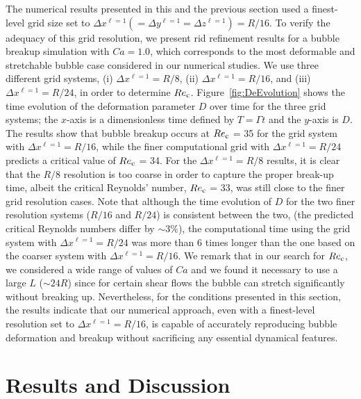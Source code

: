 \documentclass[review]{elsarticle}
\begin{document}
The numerical results presented in this and the previous section used a
finest-level grid size set to $\Delta x^{\ell=1}(= \Delta y^{\ell=1}= \Delta
z^{\ell=1})=R/16$. To verify the adequacy of this grid resolution, we present
rid refinement results for a bubble breakup simulation with $Ca=1.0$, which
corresponds to the most deformable and stretchable bubble case considered in
our numerical studies. We use three different grid systems, (i) $\Delta
x^{\ell=1}=R/8$, (ii) $\Delta x^{\ell=1}=R/16$, and (iii) $\Delta
x^{\ell=1}=R/24$, in order to determine $Re_{\rm c}$.
Figure~\ref{fig:DeEvolution} shows the time evolution of the deformation
parameter $D$ over time for the three grid systems; the $x$-axis is a
dimensionless time defined by $T=\mathit{\Gamma} t$ and the $y$-axis is $D$.
The results show that bubble breakup occurs at $Re_{\rm c}$ = 35 for the grid
system with $\Delta x^{\ell=1}=R/16$, while the finer computational grid with
$\Delta x^{\ell=1}=R/24$ predicts a critical value of $Re_{\rm c}$ = 34.  For
the $\Delta x^{\ell=1}=R/8$ results, it is clear that the $R/8$ resolution is
too coarse in order to capture the proper break-up time, albeit the critical
Reynolds' number, $Re_{\rm c}$ = 33, was still close to the finer grid
resolution cases.  Note that although the time evolution of $D$ for the two
finer resolution systems ($R/16$ and $R/24$) is consistent between the two,
(the predicted critical Reynolds numbers differ by $\sim 3\%$), the
computational time using the grid system with $\Delta x^{\ell=1}=R/24$ was more
than 6 times longer than the one based on the coarser system with $\Delta
x^{\ell=1}=R/16$.  We remark that in our search for $Re_{\rm c}$, we considered
a wide range of values of $Ca$ and we found it necessary to use a large $L$
($\sim 24R$) since for certain shear flows the bubble can stretch significantly
without breaking up.  Nevertheless, for the conditions presented in this
section, the results indicate that our numerical approach, even with a
finest-level resolution set to $\Delta x^{\ell=1}=R/16$, is capable of
accurately reproducing bubble deformation and breakup without sacrificing any
essential dynamical features.

\section{Results and Discussion}
\end{document}
